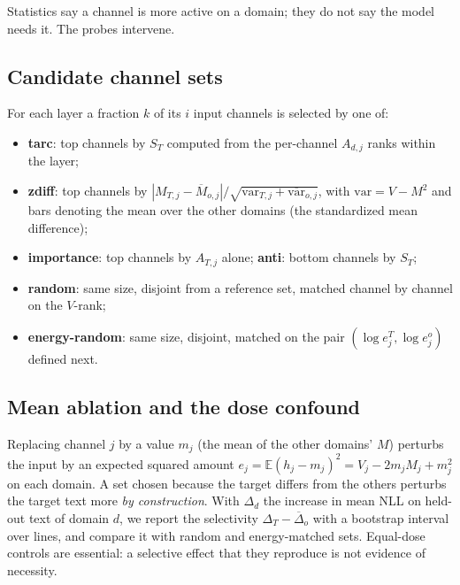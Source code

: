 \documentclass[11pt]{article}
\newcommand{\E}{\mathbb{E}}
\begin{document}
Statistics say a channel is more active on a domain; they do not say the model needs it. The probes intervene.

\subsection{Candidate channel sets}
For each layer a fraction $k$ of its $i$ input channels is selected by one of:
\begin{itemize}\setlength\itemsep{0pt}
\item \textbf{tarc}: top channels by $S_T$ computed from the per-channel $A_{d,j}$ ranks within the layer;
\item \textbf{zdiff}: top channels by $|M_{T,j}-\overline{M}_{o,j}|\big/\sqrt{\mathrm{var}_{T,j}+\overline{\mathrm{var}}_{o,j}}$,
 with $\mathrm{var}=V-M^2$ and bars denoting the mean over the other domains (the standardized mean difference);
\item \textbf{importance}: top channels by $A_{T,j}$ alone; \textbf{anti}: bottom channels by $S_T$;
\item \textbf{random}: same size, disjoint from a reference set, matched channel by channel on the $V$-rank;
\item \textbf{energy-random}: same size, disjoint, matched on the pair $(\log e^T_j,\log e^o_j)$ defined next.
\end{itemize}

\subsection{Mean ablation and the dose confound}
Replacing channel $j$ by a value $m_j$ (the mean of the other domains' $M$) perturbs the input by an expected squared amount
$e_j=\E(h_j-m_j)^2=V_j-2m_jM_j+m_j^2$ on each domain. A set chosen because the target differs from the others
perturbs the target text more \emph{by construction}. With $\Delta_d$ the increase in mean NLL on held-out text of domain $d$,
we report the selectivity $\Delta_T-\overline{\Delta}_{o}$ with a bootstrap interval over lines, and compare it with
random and energy-matched sets. Equal-dose controls are essential: a selective effect that they reproduce is not evidence of necessity.
\end{document}
